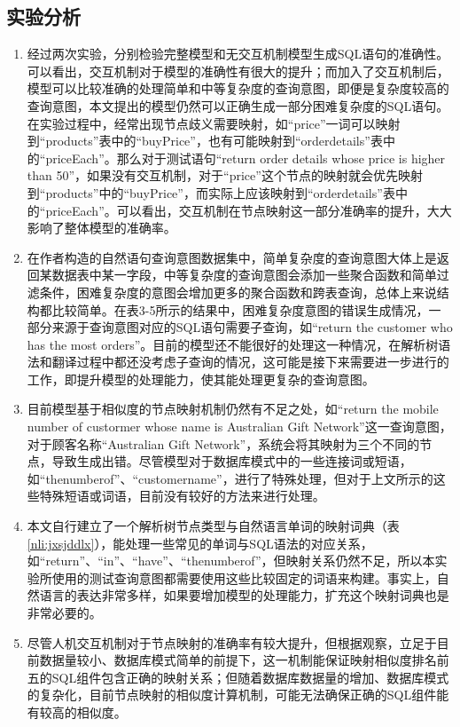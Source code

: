 \subsection{实验分析}
\begin{enumerate}
    \item 经过两次实验，分别检验完整模型和无交互机制模型生成SQL语句的准确性。可以看出，交互机制对于模型的准确性有很大的提升；而加入了交互机制后，模型可以比较准确的处理简单和中等复杂度的查询意图，即便是复杂度较高的查询意图，本文提出的模型仍然可以正确生成一部分困难复杂度的SQL语句。在实验过程中，经常出现节点歧义需要映射，如“price”一词可以映射到“products”表中的“buyPrice”，也有可能映射到“orderdetails”表中的“priceEach”。那么对于测试语句“return order details whose price is higher than 50”，如果没有交互机制，对于“price”这个节点的映射就会优先映射到“products”中的“buyPrice”，而实际上应该映射到“orderdetails”表中的“priceEach”。可以看出，交互机制在节点映射这一部分准确率的提升，大大影响了整体模型的准确率。
    \item	在作者构造的自然语句查询意图数据集中，简单复杂度的查询意图大体上是返回某数据表中某一字段，中等复杂度的查询意图会添加一些聚合函数和简单过滤条件，困难复杂度的意图会增加更多的聚合函数和跨表查询，总体上来说结构都比较简单。在表3-5所示的结果中，困难复杂度意图的错误生成情况，一部分来源于查询意图对应的SQL语句需要子查询，如“return the customer who has the most orders”。目前的模型还不能很好的处理这一种情况，在解析树语法和翻译过程中都还没考虑子查询的情况，这可能是接下来需要进一步进行的工作，即提升模型的处理能力，使其能处理更复杂的查询意图。
    \item	目前模型基于相似度的节点映射机制仍然有不足之处，如“return the mobile number of custormer whose name is Australian Gift Network”这一查询意图，对于顾客名称“Australian Gift Network”，系统会将其映射为三个不同的节点，导致生成出错。尽管模型对于数据库模式中的一些连接词或短语，如“thenumberof”、“customername”，进行了特殊处理，但对于上文所示的这些特殊短语或词语，目前没有较好的方法来进行处理。
    \item	本文自行建立了一个解析树节点类型与自然语言单词的映射词典（表\ref{nli:jxsjddlx}），能处理一些常见的单词与SQL语法的对应关系，如“return”、“in”、“have”、“thenumberof”，但映射关系仍然不足，所以本实验所使用的测试查询意图都需要使用这些比较固定的词语来构建。事实上，自然语言的表达非常多样，如果要增加模型的处理能力，扩充这个映射词典也是非常必要的。
    \item	尽管人机交互机制对于节点映射的准确率有较大提升，但根据观察，立足于目前数据量较小、数据库模式简单的前提下，这一机制能保证映射相似度排名前五的SQL组件包含正确的映射关系；但随着数据库数据量的增加、数据库模式的复杂化，目前节点映射的相似度计算机制，可能无法确保正确的SQL组件能有较高的相似度。
\end{enumerate}

